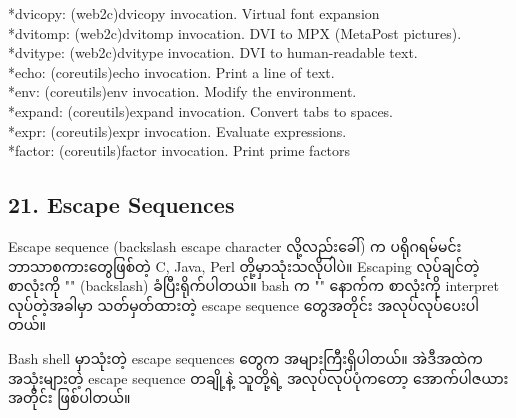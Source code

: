 \documentclass[11pt]{article}
\begin{document}
*dvicopy: (web2c)dvicopy invocation. Virtual font expansion\\
*dvitomp: (web2c)dvitomp invocation. DVI to MPX (MetaPost pictures).\\
*dvitype: (web2c)dvitype invocation. DVI to human-readable text.\\
*echo: (coreutils)echo invocation. Print a line of text.\\
*env: (coreutils)env invocation. Modify the environment.\\
*expand: (coreutils)expand invocation. Convert tabs to spaces.\\
*expr: (coreutils)expr invocation. Evaluate expressions.\\
*factor: (coreutils)factor invocation. Print prime factors

    \subsection{21. Escape Sequences}\label{escape-sequences}

Escape sequence (backslash escape character လို့လည်းခေါ်) က
ပရိုဂရမ်မင်းဘာသာစကားတွေဖြစ်တဲ့ C, Java, Perl တို့မှာသုံးသလိုပါပဲ။
Escaping လုပ်ချင်တဲ့ စာလုံးကို "" (backslash) ခံပြီးရိုက်ပါတယ်။ bash က
"" နောက်က စာလုံးကို interpret လုပ်တဲ့အခါမှာ သတ်မှတ်ထားတဲ့ escape
sequence တွေအတိုင်း အလုပ်လုပ်ပေးပါတယ်။

Bash shell မှာသုံးတဲ့ escape sequences တွေက အများကြီးရှိပါတယ်။ အဲဒီအထဲက
အသုံးများတဲ့ escape sequence တချို့နဲ့ သူတို့ရဲ့ အလုပ်လုပ်ပုံကတော့
အောက်ပါဇယားအတိုင်း ဖြစ်ပါတယ်။
\end{document}
